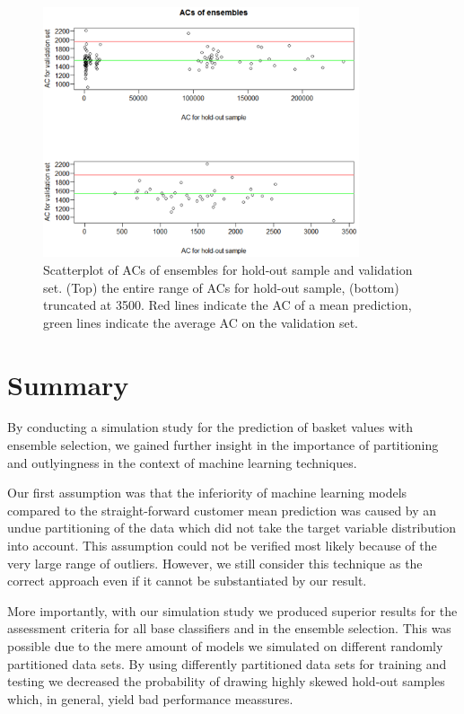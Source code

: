 \documentclass[12pt]{article}
\begin{document}
\begin{figure}[H]
\centering
\includegraphics[width=0.83\textwidth]{ACensemble.pdf}
\caption{Scatterplot of ACs of ensembles for hold-out sample and validation set. (Top) the entire range of ACs for hold-out sample, (bottom) truncated at 3500. Red lines indicate the AC of a mean prediction, green lines indicate the average AC on the validation set.}
\end{figure}

\section{Summary}

By conducting a simulation study for the prediction of basket values with ensemble selection, we gained further insight in the importance of partitioning and outlyingness in the context of machine learning techniques. 

Our first assumption was that the inferiority of machine learning models compared to the straight-forward customer mean prediction was caused by an undue partitioning of the data which did not take the target variable distribution into account. This assumption could not be verified most likely because of the very large range of outliers. However, we still consider this technique as the correct approach even if it cannot be substantiated by our result.

More importantly, with our simulation study we produced superior results for the assessment criteria for all base classifiers and in the ensemble selection. This was possible due to the mere amount of models we simulated on different randomly partitioned data sets. By using differently partitioned data sets for training and testing we decreased the probability of drawing highly skewed hold-out samples which, in general, yield bad performance meassures.
\end{document}
